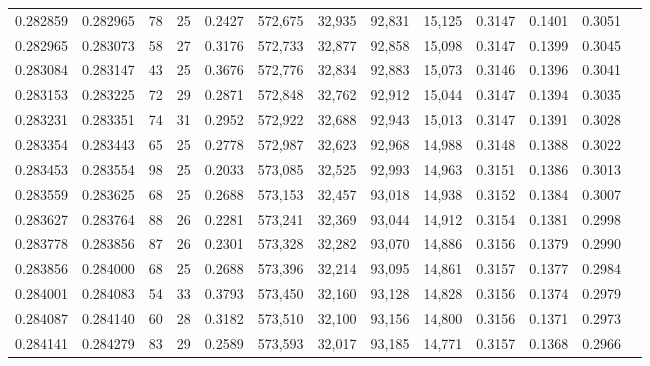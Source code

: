 \begin{tabular}{rrrrrrrrrrrrr}
0.282859 & 0.282965 &  78 &  25 &                                     0.2427 & 572,675 &  32,935 &  92,831 &  15,125 & 0.3147 & 0.1401 & 0.3051 \\
0.282965 & 0.283073 &  58 &  27 &                                     0.3176 & 572,733 &  32,877 &  92,858 &  15,098 & 0.3147 & 0.1399 & 0.3045 \\
0.283084 & 0.283147 &  43 &  25 &                                     0.3676 & 572,776 &  32,834 &  92,883 &  15,073 & 0.3146 & 0.1396 & 0.3041 \\
0.283153 & 0.283225 &  72 &  29 &                                     0.2871 & 572,848 &  32,762 &  92,912 &  15,044 & 0.3147 & 0.1394 & 0.3035 \\
0.283231 & 0.283351 &  74 &  31 &                                     0.2952 & 572,922 &  32,688 &  92,943 &  15,013 & 0.3147 & 0.1391 & 0.3028 \\
0.283354 & 0.283443 &  65 &  25 &                                     0.2778 & 572,987 &  32,623 &  92,968 &  14,988 & 0.3148 & 0.1388 & 0.3022 \\
0.283453 & 0.283554 &  98 &  25 &                                     0.2033 & 573,085 &  32,525 &  92,993 &  14,963 & 0.3151 & 0.1386 & 0.3013 \\
0.283559 & 0.283625 &  68 &  25 &                                     0.2688 & 573,153 &  32,457 &  93,018 &  14,938 & 0.3152 & 0.1384 & 0.3007 \\
0.283627 & 0.283764 &  88 &  26 &                                     0.2281 & 573,241 &  32,369 &  93,044 &  14,912 & 0.3154 & 0.1381 & 0.2998 \\
0.283778 & 0.283856 &  87 &  26 &                                     0.2301 & 573,328 &  32,282 &  93,070 &  14,886 & 0.3156 & 0.1379 & 0.2990 \\
0.283856 & 0.284000 &  68 &  25 &                                     0.2688 & 573,396 &  32,214 &  93,095 &  14,861 & 0.3157 & 0.1377 & 0.2984 \\
0.284001 & 0.284083 &  54 &  33 &                                     0.3793 & 573,450 &  32,160 &  93,128 &  14,828 & 0.3156 & 0.1374 & 0.2979 \\
0.284087 & 0.284140 &  60 &  28 &                                     0.3182 & 573,510 &  32,100 &  93,156 &  14,800 & 0.3156 & 0.1371 & 0.2973 \\
0.284141 & 0.284279 &  83 &  29 &                                     0.2589 & 573,593 &  32,017 &  93,185 &  14,771 & 0.3157 & 0.1368 & 0.2966 \\

\end{tabular}

